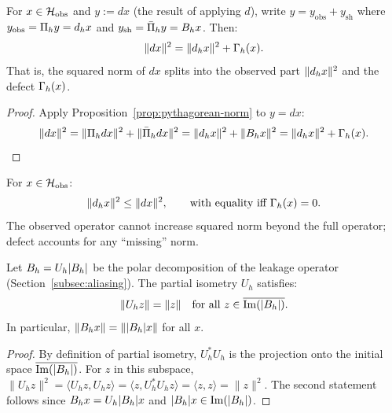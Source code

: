 \begin{proposition}
\label{prop:defect-decomp}
For $x \in \cH_{\mathrm{obs}}$ and $y := dx$ (the result of applying $d$), write $y = y_{\mathrm{obs}} + y_{\mathrm{sh}}$ where $y_{\mathrm{obs}} = \CCPi{h} y = \CCObs{d}{h} x$ and $y_{\mathrm{sh}} = \CCPibar{h} y = \CCLeak{d}{h} x$.
Then:
\[
\|dx\|^2 = \|\CCObs{d}{h} x\|^2 + \CCDefEnergy{h}{x}.
\]
That is, the squared norm of $dx$ splits into the observed part $\|\CCObs{d}{h} x\|^2$ and the defect $\CCDefEnergy{h}{x}$.
\end{proposition}

\begin{proof}
Apply Proposition~\ref{prop:pythagorean-norm} to $y = dx$:
\[
\|dx\|^2 = \|\CCPi{h} dx\|^2 + \|\CCPibar{h} dx\|^2 = \|\CCObs{d}{h} x\|^2 + \|\CCLeak{d}{h} x\|^2 = \|\CCObs{d}{h} x\|^2 + \CCDefEnergy{h}{x}. \qedhere
\]
\end{proof}

\begin{corollary}
\label{cor:norm-bound}
For $x \in \cH_{\mathrm{obs}}$:
\[
\|\CCObs{d}{h} x\|^2 \le \|dx\|^2, \qquad \text{with equality iff } \CCDefEnergy{h}{x} = 0.
\]
The observed operator cannot increase squared norm beyond the full operator; defect accounts for any ``missing'' norm.
\end{corollary}

\begin{proposition}
\label{prop:isometry-property}
Let $\CCLeak{d}{h} = U_h |\CCLeak{d}{h}|$ be the polar decomposition of the leakage operator (Section~\ref{subsec:aliasing}).
The partial isometry $U_h$ satisfies:
\[
\|U_h z\| = \|z\| \quad \text{for all } z \in \overline{\Img(|\CCLeak{d}{h}|)}.
\]
In particular, $\|\CCLeak{d}{h} x\| = \||\CCLeak{d}{h}| x\|$ for all $x$.
\end{proposition}

\begin{proof}
By definition of partial isometry, $U_h^* U_h$ is the projection onto the initial space $\overline{\Img(|\CCLeak{d}{h}|)}$.
For $z$ in this subspace, $\|U_h z\|^2 = \langle U_h z, U_h z \rangle = \langle z, U_h^* U_h z \rangle = \langle z, z \rangle = \|z\|^2$.
The second statement follows since $\CCLeak{d}{h} x = U_h |\CCLeak{d}{h}| x$ and $|\CCLeak{d}{h}| x \in \Img(|\CCLeak{d}{h}|)$.
\end{proof}

